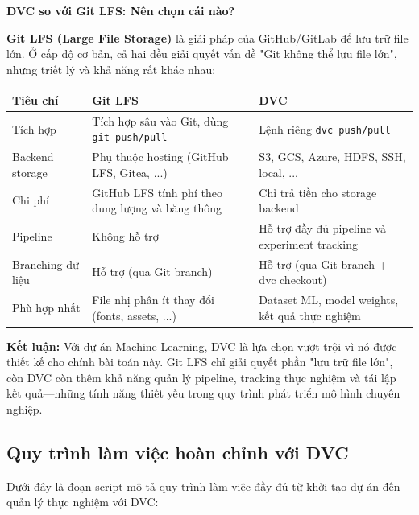 \begin{mdframed}[style=infobox]
    \textbf{DVC so với Git LFS: Nên chọn cái nào?}

    \textbf{Git LFS (Large File Storage)} là giải pháp của GitHub/GitLab để lưu trữ file lớn. Ở cấp độ cơ bản, cả hai đều giải quyết vấn đề "Git không thể lưu file lớn", nhưng triết lý và khả năng rất khác nhau:

    \begin{center}
    \begin{tabular}{|p{3cm}|p{4.5cm}|p{4.5cm}|}
    \hline
    \textbf{Tiêu chí} & \textbf{Git LFS} & \textbf{DVC} \\
    \hline
    Tích hợp & Tích hợp sâu vào Git, dùng \texttt{git push/pull} & Lệnh riêng \texttt{dvc push/pull} \\
    \hline
    Backend storage & Phụ thuộc hosting (GitHub LFS, Gitea, ...) & S3, GCS, Azure, HDFS, SSH, local, ... \\
    \hline
    Chi phí & GitHub LFS tính phí theo dung lượng và băng thông & Chỉ trả tiền cho storage backend \\
    \hline
    Pipeline & Không hỗ trợ & Hỗ trợ đầy đủ pipeline và experiment tracking \\
    \hline
    Branching dữ liệu & Hỗ trợ (qua Git branch) & Hỗ trợ (qua Git branch + dvc checkout) \\
    \hline
    Phù hợp nhất & File nhị phân ít thay đổi (fonts, assets, ...) & Dataset ML, model weights, kết quả thực nghiệm \\
    \hline
    \end{tabular}
    \end{center}

    \textbf{Kết luận:} Với dự án Machine Learning, DVC là lựa chọn vượt trội vì nó được thiết kế cho chính bài toán này. Git LFS chỉ giải quyết phần "lưu trữ file lớn", còn DVC còn thêm khả năng quản lý pipeline, tracking thực nghiệm và tái lập kết quả---những tính năng thiết yếu trong quy trình phát triển mô hình chuyên nghiệp.
\end{mdframed}

\subsection{Quy trình làm việc hoàn chỉnh với DVC}
\label{subsec:dvc_full_workflow}

Dưới đây là đoạn script mô tả quy trình làm việc đầy đủ từ khởi tạo dự án đến quản lý thực nghiệm với DVC:

